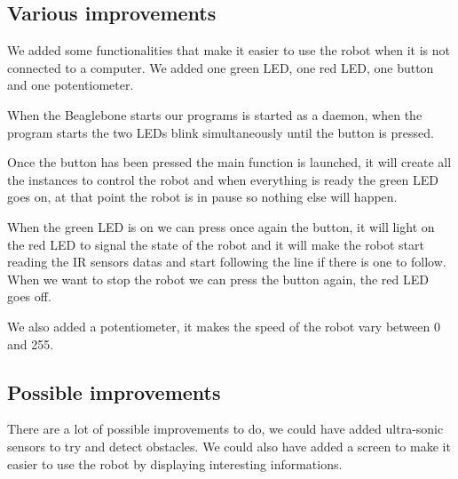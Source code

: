 \subsection*{Various improvements}

We added some functionalities that make it easier to use the robot when it is not connected to a computer.
We added one green LED, one red LED, one button and one potentiometer.

When the Beaglebone starts our programs is started as a daemon, when the program starts the two LEDs blink simultaneously until the button is pressed.

Once the button has been pressed the main function is launched, it will create all the instances to control the robot and when everything is ready the green LED goes on, at that point the robot is in pause so nothing else will happen.

When the green LED is on we can press once again the button, it will light on the red LED to signal the state of the robot and it will make the robot start reading the IR sensors datas and start following the line if there is one to follow.
When we want to stop the robot we can press the button again, the red LED goes off.

We also added a potentiometer, it makes the speed of the robot vary between 0 and 255.

\subsection*{Possible improvements}

There are a lot of possible improvements to do, we could have added ultra-sonic sensors to try and detect obstacles.
We could also have added a screen to make it easier to use the robot by displaying interesting informations.
